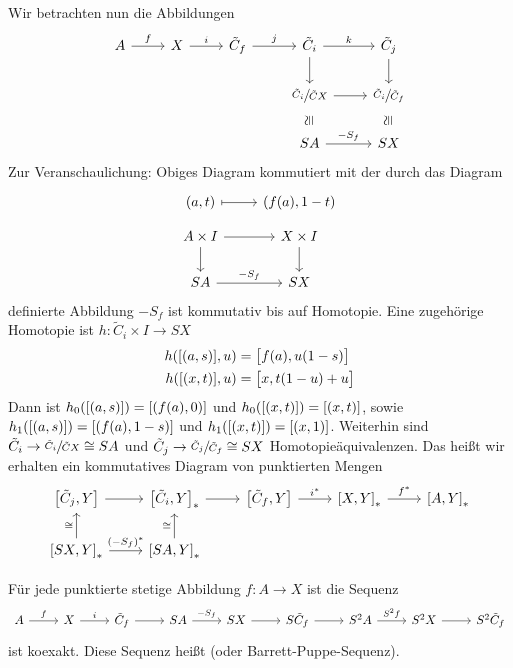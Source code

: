 Wir betrachten nun die Abbildungen \[
	\begin{tikzcd}
		A \rar["f"] & X \rar["i"] & \tilde{C}_f \rar["j"] & \tilde{C}_i \rar["k"] \dar & \tilde{C}_j  \dar\\
		&&& \sfrac{\tilde{C}_i}{\tilde{C}X} \rar & \sfrac{\tilde{C}_i}{\tilde{C}_f} \\
		&&& S A \uar[phantom,"\cong",sloped] \rar["-S_f"] & SX \uar[phantom,"\cong",sloped]
	\end{tikzcd}
\]
Zur Veranschaulichung:
Obiges Diagram kommutiert mit der durch das Diagram 
\[
	\begin{tikzcd}
		(a,t) \rar[mapsto] & (f(a),1-t)\\[-1em]
		A \times I \dar \rar & X \times I \dar \\
		SA \rar["-S_f"] & SX
	\end{tikzcd}
\]
definierte Abbildung $-S_f$ ist kommutativ bis auf Homotopie.
Eine zugehörige Homotopie ist $h \colon \tilde{C}_i \times I \to SX$
\begin{align}
	h \enbrace*{\benbrace*{(a,s)},u} &= \benbrace[\big]{f(a), u(1-s)} \\
	h \enbrace*{\benbrace*{(x,t)},u} &= \benbrace[\big]{x, t(1-u) +u}
\end{align}
Dann ist $h_0 \enbrace*{\benbrace*{(a,s)}} = \benbrace*{(f(a),0)}$ und $h_0( \benbrace*{(x,t)}) = \benbrace*{(x,t)}$, sowie $h_1 \enbrace*{\benbrace*{(a,s)}} = \benbrace*{\enbrace*{f(a),1-s}}$ und $h_1 \enbrace*{\benbrace*{(x,t)}} = \benbrace*{(x,1)}$.
Weiterhin sind $\tilde{C}_i \to \sfrac{\tilde{C}_i}{\tilde{C}X} \cong SA$ und $\tilde{C}_j \to \sfrac{\tilde{C}_j}{\tilde{C}_f} \cong SX$ Homotopieäquivalenzen.
Das heißt wir erhalten ein kommutatives Diagram von punktierten Mengen
\[
	\begin{tikzcd}
		\benbrace*{\tilde{C}_j,Y} \rar & \benbrace*{\tilde{C}_i,Y}_* \rar & \benbrace*{\tilde{C}_f,Y} \rar["i^*"] & \benbrace*{X,Y}_* \rar["f^*"] & \benbrace*{A,Y}_* \\
		\benbrace*{SX,Y}_* \uar["\cong"] \rar["(-S_f)^*"] & \benbrace*{SA,Y}_* \uar["\cong"] 
	\end{tikzcd}
\]
\begin{satz}[name={Puppe}]
	Für jede punktierte stetige Abbildung $f \colon A \to X$ ist die Sequenz 
	\[
		\begin{tikzcd}
			A \rar["f"] & X \rar["i"] & \tilde{C}_f \rar & SA \rar["-S_f"] & SX \rar & S \tilde{C}_f \rar & S^2 A \rar["S^2 f"] & S^2 X \rar & S^2 \tilde{C}_f
		\end{tikzcd}
	\]
	ist koexakt.
	Diese Sequenz heißt  (oder Barrett-Puppe-Sequenz).
\end{satz}



